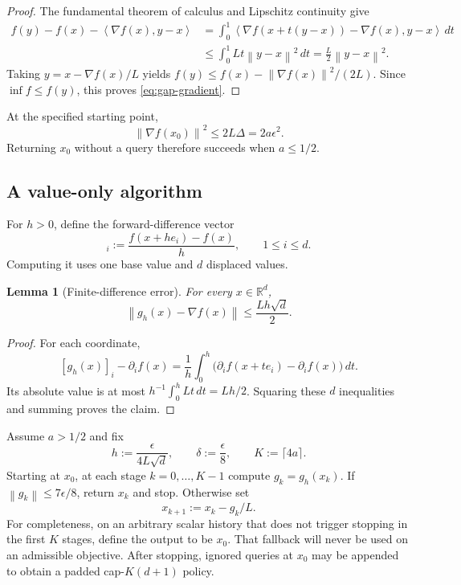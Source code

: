 \documentclass[11pt]{article}
\numberwithin{equation}{section}
\newtheorem{lemma}[lemma]{Lemma}
\theoremstyle{definition}
\theoremstyle{remark}
\newcommand{\R}{\mathbb{R}}
\newcommand{\norm}[1]{\left\lVert #1\right\rVert}
\newcommand{\ip}[2]{\left\langle #1,#2\right\rangle}
\begin{document}
\begin{proof}
The fundamental theorem of calculus and Lipschitz continuity give
\begin{align*}
 f(y)-f(x)-\ip{\nabla f(x)}{y-x}
 &=\int_0^1\ip{\nabla f(x+t(y-x))-\nabla f(x)}{y-x}\,dt\\
 &\leq\int_0^1 Lt\norm{y-x}^2\,dt
 =\frac{L}{2}\norm{y-x}^2.
\end{align*}
Taking $y=x-\nabla f(x)/L$ yields
$f(y)\leq f(x)-\norm{\nabla f(x)}^2/(2L)$.
Since $\inf f\leq f(y)$, this proves \eqref{eq:gap-gradient}.
\end{proof}

At the specified starting point,
\begin{equation}
    \norm{\nabla f(x_0)}^2\leq2L\Delta=2a\epsilon^2.
    \label{eq:start}
\end{equation}
Returning $x_0$ without a query therefore succeeds when $a\leq1/2$.

\subsection{A value-only algorithm}

For $h>0$, define the forward-difference vector
\begin{equation}
    [g_h(x)]_i:=\frac{f(x+he_i)-f(x)}{h},
    \qquad 1\leq i\leq d.
    \label{eq:fd}
\end{equation}
Computing it uses one base value and $d$ displaced values.

\begin{lemma}[Finite-difference error]
\label{lem:fd}
For every $x\in\R^d$,
\begin{equation}
    \norm{g_h(x)-\nabla f(x)}\leq\frac{Lh\sqrt d}{2}.
    \label{eq:fd-error}
\end{equation}
\end{lemma}

\begin{proof}
For each coordinate,
\[
 [g_h(x)]_i-\partial_i f(x)
 =\frac1h\int_0^h\bigl(\partial_i f(x+te_i)-\partial_i f(x)\bigr)\,dt.
\]
Its absolute value is at most
$h^{-1}\int_0^h Lt\,dt=Lh/2$. Squaring these $d$ inequalities and summing
proves the claim.
\end{proof}

Assume $a>1/2$ and fix
\begin{equation}
    h:=\frac{\epsilon}{4L\sqrt d},\qquad
    \delta:=\frac{\epsilon}{8},\qquad K:=\lceil4a\rceil.
    \label{eq:upper-parameters}
\end{equation}
Starting at $x_0$, at each stage $k=0,\ldots,K-1$ compute $g_k=g_h(x_k)$.
If $\norm{g_k}\leq7\epsilon/8$, return $x_k$ and stop. Otherwise set
\begin{equation}
    x_{k+1}:=x_k-g_k/L.
    \label{eq:update}
\end{equation}
For completeness, on an arbitrary scalar history that does not trigger
stopping in the first $K$ stages, define the output to be $x_0$.
That fallback will never be used on an admissible objective. After stopping,
ignored queries at $x_0$ may be appended to obtain a padded cap-$K(d+1)$ policy.
\end{document}
